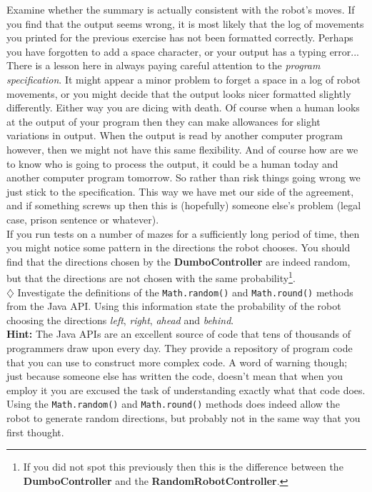\noindent
Examine whether the summary is actually consistent with the robot's moves. 
If you find that the output seems wrong, it is most likely that the log of
movements you printed for the previous exercise 
has not been formatted correctly. Perhaps you have
forgotten to add a space character, or your output has a typing error...\\

\noindent
There is a lesson here in always paying careful attention to the {\em 
program specification}. It might appear a minor problem to forget a space 
in a log of robot movements, or you might decide that the output looks nicer
formatted slightly differently. Either way you are dicing with death. Of 
course when a human looks at the output of your program then they can make 
allowances for slight variations in output. When the output is read by another
computer program however, then we might not have this same flexibility. And
of course how are we to know who is going to process the output, it could
be a human today and another computer program tomorrow. So rather than risk
things going wrong we just stick to the specification. This way we have met 
our side of the agreement, and if something screws up then this is (hopefully)
someone else's problem (legal case, prison sentence or whatever).\\

\noindent
If you run tests on a number of mazes for a sufficiently long period of time, 
then you might notice some pattern in the directions the robot chooses.
You should find that the directions chosen by the {\bf DumboController} are 
indeed random, but that the directions are not chosen with the same 
probability\footnote{If you 
did not spot this previously then this is the difference between the {\bf DumboController}
and the {\bf RandomRobotController}.}. \\

\noindent
$\diamondsuit$ Investigate the definitions of the {\tt Math.random()} and {\tt Math.round()} methods from
the Java API. 
Using this information state the probability of the robot choosing the directions {\em left},
{\em right}, {\em ahead} and {\em behind}. \\

\noindent
{\bf Hint:} The Java APIs are an excellent source of code that tens of thousands of 
programmers draw upon every day. They provide a repository of program code 
that you can use to construct more complex code. A word of warning though; just because 
someone else has written the code, doesn't mean that when you employ it you are excused 
the task of understanding exactly what that code does. Using the {\tt Math.random()} and
{\tt Math.round()} methods does indeed allow the robot to generate random directions, but 
probably not in the same way that you first thought. 

